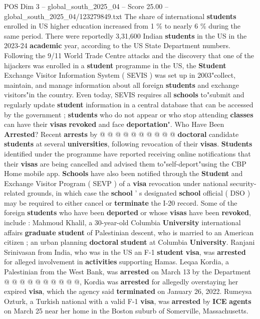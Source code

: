 \begin{textsample}{POS Dim 3 – global\_south\_2025\_04 – Score 25.00 – global\_south\_2025\_04/123279849.txt}
The share of international \textbf{students} enrolled in US higher education increased from 1 \% to nearly 6 \% during the same period.
There were reportedly 3,31,600 Indian \textbf{students} in the US in the 2023-24 \textbf{academic} year, according to the US State Department numbers.
Following the 9/11 World Trade Centre attacks and the discovery that one of the hijackers was enrolled in a \textbf{student} programme in the US, the \textbf{Student} Exchange Visitor Information System ( SEVIS ) was set up in 2003"collect, maintain, and manage information about all foreign \textbf{students} and exchange visitors"in the country.
Even today, SEVIS requires all \textbf{schools} to"submit and regularly update \textbf{student} information in a central database that can be accessed by the government ; \textbf{students} who do not appear or who stop attending \textbf{classes} can have their \textbf{visas} \textbf{revoked} and face \textbf{deportation}".
Who Have Been \textbf{Arrested}?
Recent \textbf{arrests} by @ @ @ @ @ @ @ @ @ @ \textbf{doctoral} candidate \textbf{students} at several \textbf{universities}, following revocation of their \textbf{visas}. \textbf{Students} identified under the programme have reported receiving online notifications that their \textbf{visas} are being cancelled and advised them to"self-deport"using the CBP Home mobile app. \textbf{Schools} have also been notified through the \textbf{Student} and Exchange Visitor Program ( SEVP ) of a \textbf{visa} revocation under national security-related grounds, in which case the \textbf{school} ' s designated \textbf{school} official ( DSO ) may be required to either cancel or \textbf{terminate} the I-20 record.
Some of the foreign \textbf{students} who have been \textbf{deported} or whose \textbf{visas} have been \textbf{revoked}, include : Mahmoud Khalil, a 30-year-old Columbia \textbf{University} international affairs \textbf{graduate} \textbf{student} of Palestinian descent, who is married to an American citizen ; an urban planning \textbf{doctoral} \textbf{student} at Columbia \textbf{University}.
Ranjani Srinivasan from India, who was in the US an F-1 \textbf{student} \textbf{visa}, was \textbf{arrested} for alleged involvement in \textbf{activities} supporting Hamas.
Leqaa Kordia, a Palestinian from the West Bank, was \textbf{arrested} on March 13 by the Department @ @ @ @ @ @ @ @ @ @, Kordia was \textbf{arrested} for allegedly overstaying her expired \textbf{visa}, which the agency said \textbf{terminated} on January 26, 2022.
Rumeysa Ozturk, a Turkish national with a valid F-1 \textbf{visa}, was \textbf{arrested} by \textbf{ICE} \textbf{agents} on March 25 near her home in the Boston suburb of Somerville, Massachusetts.

\end{textsample}
